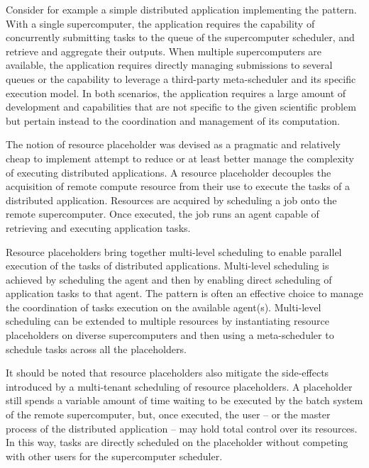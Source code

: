 \documentclass{sig-alternate}
\begin{document}
Consider for example a simple distributed application implementing the \MW
pattern. With a single supercomputer, the application requires the capability of
concurrently submitting tasks to the queue of the supercomputer scheduler, and
retrieve and aggregate their outputs. When multiple supercomputers are
available, the application requires directly managing submissions to several
queues or the capability to leverage a third-party meta-scheduler and its
specific execution model. In both scenarios, the application requires a large
amount of development and capabilities that are not specific to the given
scientific problem but pertain instead to the coordination and management of its
computation.

The notion of resource placeholder was devised as a pragmatic and relatively
cheap to implement attempt to reduce or at least better manage the complexity of
executing distributed applications. A resource placeholder decouples the
acquisition of remote compute resource from their use to execute the tasks of a
distributed application. Resources are acquired by scheduling a job onto the
remote supercomputer. Once executed, the job runs an agent capable of retrieving
and executing application tasks.

Resource placeholders bring together multi-level scheduling to enable parallel
execution of the tasks of distributed applications. Multi-level scheduling is
achieved by scheduling the agent and then by enabling direct scheduling of
application tasks to that agent. The \MW pattern is often an effective choice to
manage the coordination of tasks execution on the available agent(s).
Multi-level scheduling can be extended to multiple resources by instantiating
resource placeholders on diverse supercomputers and then using a meta-scheduler
to schedule tasks across all the placeholders.

It should be noted that resource placeholders also mitigate the side-effects
introduced by a multi-tenant scheduling of resource placeholders. A placeholder
still spends a variable amount of time waiting to be executed by the batch
system of the remote supercomputer, but, once executed, the user -- or the
master process of the distributed application -- may hold total control over its
resources. In this way, tasks are directly scheduled on the placeholder without
competing with other users for the supercomputer scheduler.  
\end{document}
